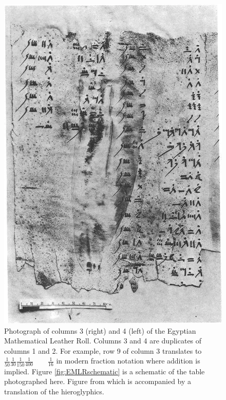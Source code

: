 
\begin{figure}
  \centering
  \includegraphics[width=\textwidth]{gfx/EMLR}
  \caption[Photograph of columns 3 and 4 of the Egyptian Mathematical Leather Roll.]
  {Photograph of columns 3 (right) and 4 (left) of the Egyptian Mathematical Leather Roll. Columns 3 and 4 are duplicates of columns 1 and 2. For example, row 9 of column 3 translates to $\displaystyle \frac{1}{50}\frac{1}{30}\frac{1}{150}\frac{1}{400} \quad\quad \frac{1}{16}$ in modern fraction notation where addition is implied. Figure \ref{fig:EMLRschematic} is a schematic of the table photographed here. Figure from \citet{Glanville27} which is accompanied by a translation of the hieroglyphics.}
  \label{fig:EMLR}
\end{figure}

